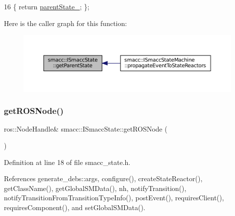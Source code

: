 \begin{DoxyCode}
16 \{ \textcolor{keywordflow}{return} \hyperlink{classsmacc_1_1ISmaccState_ad61db41d8d06a836e7d1dac7767f5695}{parentState\_}; \};
\end{DoxyCode}
Here is the caller graph for this function\+:
\nopagebreak
\begin{figure}[H]
\begin{center}
\leavevmode
\includegraphics[width=350pt]{classsmacc_1_1ISmaccState_a3484b4a32ef47a8650f08df67de4fae5_icgraph}
\end{center}
\end{figure}
\mbox{\label{classsmacc_1_1ISmaccState_a5d3f13b9d7ae7fdcf9da21c4ed935706}} 
\subsubsection{\texorpdfstring{get\+R\+O\+S\+Node()}{getROSNode()}}
{\footnotesize\ttfamily ros\+::\+Node\+Handle\& smacc\+::\+I\+Smacc\+State\+::get\+R\+O\+S\+Node (\begin{DoxyParamCaption}{ }\end{DoxyParamCaption})\hspace{0.3cm}{\ttfamily [inline]}}



Definition at line 18 of file smacc\+\_\+state.\+h.



References generate\+\_\+debs\+::args, configure(), create\+State\+Reactor(), get\+Class\+Name(), get\+Global\+S\+M\+Data(), nh, notify\+Transition(), notify\+Transition\+From\+Transition\+Type\+Info(), post\+Event(), requires\+Client(), requires\+Component(), and set\+Global\+S\+M\+Data().


